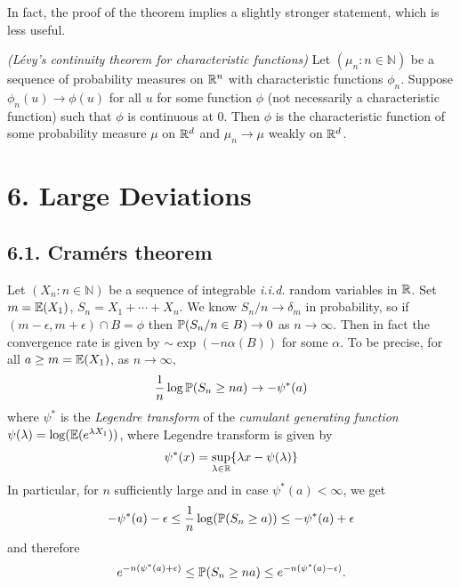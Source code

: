 \documentclass[12pt,a4paper]{report}
\begin{document}
In fact, the proof of the theorem implies a slightly stronger statement, which is less useful.
\s

 \emph{(L\'{e}vy's continuity theorem for characteristic functions)} Let $(\mu_n : n\in \mathbb{N})$ be a sequence of probability measures on $\mathbb{R}^n$ with characteristic functions $\phi_n$. Suppose $\phi_n (u) \rightarrow \phi(u)$ for all $u$ for some function $\phi$ (not necessarily a characteristic function) such that $\phi$ is continuous at $0$. Then $\phi$ is the characteristic function of some probability measure $\mu$ on $\mathbb{R}^d$ and $\mu_n \rightarrow \mu$ weakly on $\mathbb{R}^d$.
\s

\section*{6. Large Deviations}
	
\subsection*{6.1. Cram\'{e}rs theorem}

 Let $(X_n : n\in \mathbb{N})$ be a sequence of integrable \emph{i.i.d.} random variables in $\mathbb{R}$. Set $m = \mathbb{E}(X_1)$, $S_n = X_1 + \cdots + X_n$. We know $S_n / n \rightarrow \delta_m$ in probability, so if $(m-\epsilon, m+ \epsilon) \cap B =\phi$ then $\mathbb{P} (S_n/n \in B) \rightarrow 0$ as $n\rightarrow \infty$. Then in fact the convergence rate is given by $\sim \exp (-n \alpha(B))$ for some $\alpha$. To be precise, for all $a\geq m = \mathbb{E}(X_1)$, as $n\rightarrow \infty$,
\begin{align*}
\frac{1}{n} \log \mathbb{P} (S_n \geq na) \rightarrow -\psi^*(a)
\end{align*}
where $\psi^*$ is the \emph{Legendre transform} of the \emph{cumulant generating function} $\psi (\lambda) = \log (\mathbb{E}(e^{\lambda X_1}))$, where Legendre transform is given by
\begin{align*}
\psi^* (x) = \sup_{\lambda \in \mathbb{R}} \{ \lambda x - \psi(\lambda) \}
\end{align*}
\quad In particular, for $n$ sufficiently large and in case $\psi^{*}(a) < \infty$, we get
\begin{align*}
-\psi^{*}(a) - \epsilon \leq \frac{1}{n} \log (\mathbb{P}(S_n \geq a)) \leq -\psi^{*}(a) + \epsilon 
\end{align*}
and therefore
\begin{align*}
e^{-n(\psi^*(a)+\epsilon)} \leq \mathbb{P} (S_n \geq na) \leq e^{-n(\psi^*(a)-\epsilon)} .
\end{align*}
\s
\end{document}
